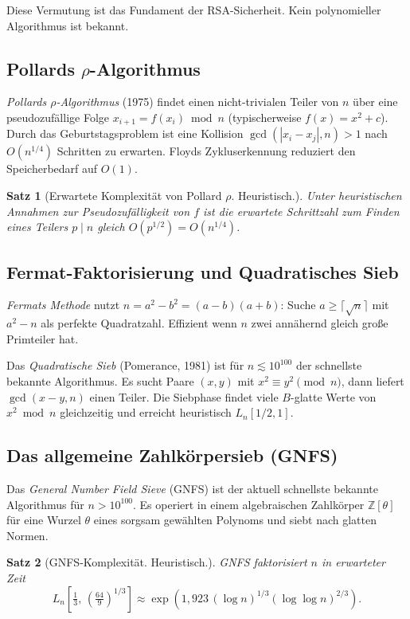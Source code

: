 \documentclass[12pt,a4paper]{amsart}
\newtheorem{theorem}{Satz}[section]
\theoremstyle{definition}
\begin{document}
Diese Vermutung ist das Fundament der RSA-Sicherheit. Kein polynomieller
Algorithmus ist bekannt.

\subsection{Pollards $\rho$-Algorithmus}

\emph{Pollards $\rho$-Algorithmus} (1975) findet einen nicht-trivialen Teiler
von $n$ über eine pseudozufällige Folge $x_{i+1} = f(x_i) \bmod n$
(typischerweise $f(x) = x^2 + c$). Durch das Geburtstagsproblem ist eine
Kollision $\gcd(|x_i - x_j|, n) > 1$ nach $O(n^{1/4})$ Schritten zu erwarten.
Floyds Zykluserkennung reduziert den Speicherbedarf auf $O(1)$.

\begin{theorem}[Erwartete Komplexität von Pollard $\rho$. Heuristisch.]
Unter heuristischen Annahmen zur Pseudozufälligkeit von $f$ ist die erwartete
Schrittzahl zum Finden eines Teilers $p \mid n$ gleich $O(p^{1/2}) = O(n^{1/4})$.
\end{theorem}

\subsection{Fermat-Faktorisierung und Quadratisches Sieb}

\emph{Fermats Methode} nutzt $n = a^2 - b^2 = (a-b)(a+b)$: Suche
$a \ge \lceil\sqrt{n}\rceil$ mit $a^2 - n$ als perfekte Quadratzahl. Effizient
wenn $n$ zwei annähernd gleich große Primteiler hat.

Das \emph{Quadratische Sieb} (Pomerance, 1981) ist für $n \lesssim 10^{100}$
der schnellste bekannte Algorithmus. Es sucht Paare $(x,y)$ mit
$x^2 \equiv y^2 \pmod{n}$, dann liefert $\gcd(x-y, n)$ einen Teiler.
Die Siebphase findet viele $B$-glatte Werte von $x^2 \bmod n$ gleichzeitig
und erreicht heuristisch $L_n[1/2, 1]$.

\subsection{Das allgemeine Zahlkörpersieb (GNFS)}

Das \emph{General Number Field Sieve} (GNFS) ist der aktuell schnellste bekannte
Algorithmus für $n > 10^{100}$. Es operiert in einem algebraischen Zahlkörper
$\mathbb{Z}[\theta]$ für eine Wurzel $\theta$ eines sorgsam gewählten Polynoms
und siebt nach glatten Normen.

\begin{theorem}[GNFS-Komplexität. Heuristisch.]
GNFS faktorisiert $n$ in erwarteter Zeit
\[
  L_n\!\left[\tfrac{1}{3},\, \left(\tfrac{64}{9}\right)^{1/3}\right]
  \approx \exp\!\left(1{,}923\,(\log n)^{1/3}(\log\log n)^{2/3}\right).
\]
\end{theorem}
\end{document}
